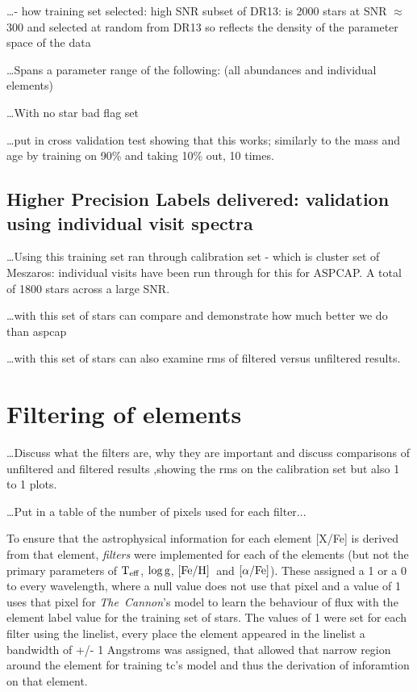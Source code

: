 \documentclass[12pt, preprint]{aastex}
\newcommand{\project}[1]{\textsl{#1}}
\newcommand{\tc}{\project{The~Cannon}}
\newcommand{\teff}{\mbox{$\rm T_{eff}$}}
\newcommand{\feh}{\mbox{$\rm [Fe/H]$}}
\newcommand{\alphafe}{\mbox{$\rm [\alpha/Fe]$}}
\newcommand{\logg}{\mbox{$\rm \log g$}}
\begin{document}
\ldots - how training set selected: high SNR subset of DR13: is 2000 stars at SNR $\approx$ 300 and selected at random from DR13 so reflects the density of the parameter space of the data

\ldots Spans a parameter range of the following: (all abundances and individual elements) 

\ldots With no star bad flag set 



\ldots put in cross validation test showing that this works; similarly to the mass and age by training on 90\% and taking 10\% out, 10 times.

\subsection{Higher Precision Labels delivered: validation using individual visit spectra} 

\ldots Using this training set ran through calibration set - which is cluster set of Meszaros: individual visits have been run through for this for ASPCAP. A total of 1800 stars across a large SNR. 

\ldots with this set of stars can compare and demonstrate how much better we do than aspcap

\ldots with this set of stars can also examine rms of filtered versus unfiltered results. 


\section{Filtering of elements} 

\ldots Discuss what the filters are, why they are important and discuss comparisons of unfiltered and filtered results ,showing the rms on the calibration set but also 1 to 1 plots. 

\ldots Put in a table of the number of pixels used for each filter...

To ensure that the astrophysical information for each element [X/Fe] is derived from that element, \textit{filters} were implemented for each of the elements 
(but not the primary parameters of \teff, \logg, \feh\ and \alphafe). These assigned a 1 or a 0 to every wavelength, where a null value does not use that pixel and a value of 1 uses that pixel for \tc's model to learn the behaviour of flux with the element label value for the training set of stars. The values of 1 were set for each filter using the linelist, every place the element appeared in the linelist a bandwidth of +/- 1 Angstroms was assigned, that allowed that narrow region around the element for training tc's model and thus the derivation of inforamtion on that element. 
\end{document}
